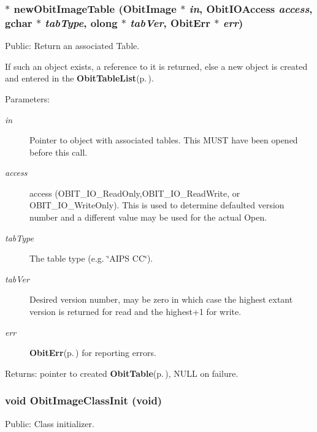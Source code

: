 \subsubsection{$\ast$ new\-Obit\-Image\-Table ({\bf Obit\-Image} $\ast$ {\em in}, Obit\-IOAccess {\em access}, gchar $\ast$ {\em tab\-Type}, {\bf olong} $\ast$ {\em tab\-Ver}, {\bf Obit\-Err} $\ast$ {\em err})}\label{ObitImage_8h_a35}


Public: Return an associated Table. 

If such an object exists, a reference to it is returned, else a new object is created and entered in the {\bf Obit\-Table\-List}{\rm (p.\,\pageref{structObitTableList})}. \begin{Desc}
\item[Parameters:]
\begin{description}
\item[{\em in}]Pointer to object with associated tables. This MUST have been opened before this call. \item[{\em access}]access (OBIT\_\-IO\_\-Read\-Only,OBIT\_\-IO\_\-Read\-Write, or OBIT\_\-IO\_\-Write\-Only). This is used to determine defaulted version number and a different value may be used for the actual Open. \item[{\em tab\-Type}]The table type (e.g. \char`\"{}AIPS CC\char`\"{}). \item[{\em tab\-Ver}]Desired version number, may be zero in which case the highest extant version is returned for read and the highest+1 for write. \item[{\em err}]{\bf Obit\-Err}{\rm (p.\,\pageref{structObitErr})} for reporting errors. \end{description}
\end{Desc}
\begin{Desc}
\item[Returns:]pointer to created {\bf Obit\-Table}{\rm (p.\,\pageref{structObitTable})}, NULL on failure. \end{Desc}
\subsubsection{\setlength{\rightskip}{0pt plus 5cm}void Obit\-Image\-Class\-Init (void)}\label{ObitImage_8h_a16}


Public: Class initializer. 

